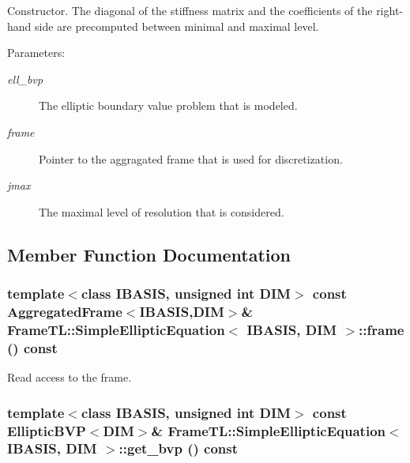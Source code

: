 Constructor. The diagonal of the stiffness matrix and the coefficients of the right-hand side are precomputed between minimal and maximal level.

\begin{Desc}
\item[Parameters:]
\begin{description}
\item[{\em ell\_\-bvp}]The elliptic boundary value problem that is modeled. \item[{\em frame}]Pointer to the aggragated frame that is used for discretization. \item[{\em jmax}]The maximal level of resolution that is considered. \end{description}
\end{Desc}


\subsection{Member Function Documentation}
\hypertarget{classFrameTL_1_1SimpleEllipticEquation_21d88cf95981a8f5c3187c7339491b41}{
\subsubsection[frame]{\setlength{\rightskip}{0pt plus 5cm}template$<$class IBASIS, unsigned int DIM$>$ const {\bf AggregatedFrame}$<$IBASIS,DIM$>$\& {\bf FrameTL::SimpleEllipticEquation}$<$ IBASIS, DIM $>$::frame () const}}
\label{classFrameTL_1_1SimpleEllipticEquation_21d88cf95981a8f5c3187c7339491b41}


Read access to the frame. \hypertarget{classFrameTL_1_1SimpleEllipticEquation_d1559772cff60c00487587b4a160a60f}{
\subsubsection[get\_\-bvp]{\setlength{\rightskip}{0pt plus 5cm}template$<$class IBASIS, unsigned int DIM$>$ const EllipticBVP$<$DIM$>$\& {\bf FrameTL::SimpleEllipticEquation}$<$ IBASIS, DIM $>$::get\_\-bvp () const}}
\label{classFrameTL_1_1SimpleEllipticEquation_d1559772cff60c00487587b4a160a60f}


